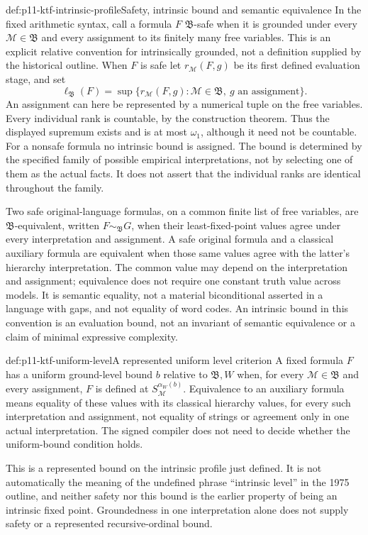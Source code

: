 \begin{hbdefinition}{def:p11-ktf-intrinsic-profile}{Safety, intrinsic bound and semantic equivalence}
In the fixed arithmetic syntax, call a formula \(F\)
\(\mathfrak B\)-safe when it is grounded under every
\(\mathcal M\in\mathfrak B\) and every assignment to its
finitely many free variables. This is an explicit relative convention
for intrinsically grounded, not a definition supplied by the historical
outline. When \(F\) is safe let \(r_{\mathcal M}(F,g)\)
be its first defined evaluation stage, and set
\[
 \ell_{\mathfrak B}(F)=
   \sup\{r_{\mathcal M}(F,g):\mathcal M\in\mathfrak B,
                                  \ g\text{ an assignment}\}.
\]
An assignment can here be represented by a numerical tuple on the
free variables. Every individual rank is countable, by the construction
theorem. Thus the displayed supremum exists and is at most
\(\omega_1\), although it need not be countable. For a nonsafe
formula no intrinsic bound is assigned. The bound is determined by
the specified family of possible empirical interpretations, not by
selecting one of them as the actual facts. It does not assert that
the individual ranks are identical throughout the family.

Two safe original-language formulas, on a common finite list of free
variables, are \(\mathfrak B\)-equivalent, written
\(F\sim_{\mathfrak B}G\), when their least-fixed-point values
agree under every interpretation and assignment. A safe original
formula and a classical auxiliary formula are equivalent when those
same values agree with the latter's hierarchy interpretation.
The common value may depend on the interpretation and assignment;
equivalence does not require one constant truth value across models.
It is semantic equality, not a material biconditional asserted in a
language with gaps, and not equality of word codes. An intrinsic
bound in this convention is an evaluation bound, not an invariant
of semantic equivalence or a claim of minimal expressive complexity.
\end{hbdefinition}

\begin{hbdefinition}{def:p11-ktf-uniform-level}{A represented uniform level criterion}
A fixed formula \(F\) has a uniform ground-level bound \(b\)
relative to \(\mathfrak B,W\) when, for every
\(\mathcal M\in\mathfrak B\) and every assignment,
\(F\) is defined at \(S_{\mathcal M}^{\alpha_W(b)}\).
Equivalence to an auxiliary formula means equality of these values
with its classical hierarchy values, for every such interpretation
and assignment, not equality of strings or agreement only in one
actual interpretation. The signed compiler does not need to decide
whether the uniform-bound condition holds.

This is a represented bound on the intrinsic profile just defined.
It is not automatically the meaning of the undefined phrase
``intrinsic level'' in the 1975 outline, and neither safety nor this
bound is the earlier property of being an intrinsic fixed point.
Groundedness in one interpretation alone does not supply safety
or a represented recursive-ordinal bound.
\end{hbdefinition}

